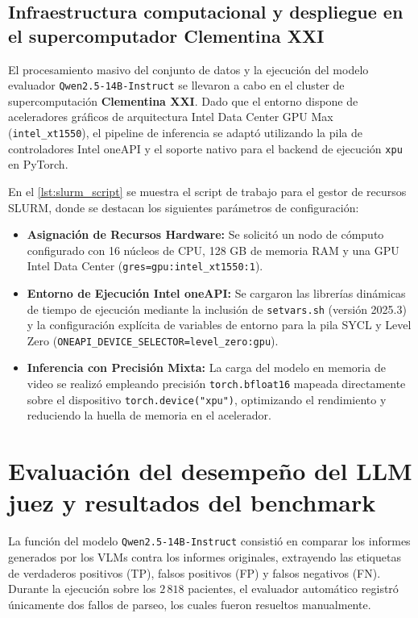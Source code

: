 \documentclass[../tesis.tex]{subfiles}
\begin{document}
\subsection{Infraestructura computacional y despliegue en el supercomputador Clementina XXI}
\label{subsec:clementina_xxi}

El procesamiento masivo del conjunto de datos y la ejecución del modelo evaluador \texttt{Qwen2.5-14B-Instruct} se llevaron a cabo en el cluster de supercomputación \textbf{Clementina XXI}. Dado que el entorno dispone de aceleradores gráficos de arquitectura Intel Data Center GPU Max (\texttt{intel\_xt1550}), el pipeline de inferencia se adaptó utilizando la pila de controladores Intel oneAPI y el soporte nativo para el backend de ejecución \texttt{xpu} en PyTorch.

En el \autoref{lst:slurm_script} se muestra el script de trabajo para el gestor de recursos SLURM, donde se destacan los siguientes parámetros de configuración:

\begin{itemize}
    \item \textbf{Asignación de Recursos Hardware:} Se solicitó un nodo de cómputo configurado con 16 núcleos de CPU, 128 GB de memoria RAM y una GPU Intel Data Center (\texttt{gres=gpu:intel\_xt1550:1}).
    \item \textbf{Entorno de Ejecución Intel oneAPI:} Se cargaron las librerías dinámicas de tiempo de ejecución mediante la inclusión de \texttt{setvars.sh} (versión 2025.3) y la configuración explícita de variables de entorno para la pila SYCL y Level Zero (\texttt{ONEAPI\_DEVICE\_SELECTOR=level\_zero:gpu}).
    \item \textbf{Inferencia con Precisión Mixta:} La carga del modelo en memoria de video se realizó empleando precisión \texttt{torch.bfloat16} mapeada directamente sobre el dispositivo \texttt{torch.device("xpu")}, optimizando el rendimiento y reduciendo la huella de memoria en el acelerador.
\end{itemize}



\section{Evaluación del desempeño del LLM juez y resultados del benchmark}
\label{sec:eval_juez_benchmark}

La función del modelo \texttt{Qwen2.5-14B-Instruct} consistió en comparar los informes generados por los VLMs contra los informes originales, extrayendo las etiquetas de verdaderos positivos (TP), falsos positivos (FP) y falsos negativos (FN). Durante la ejecución sobre los $2\,818$ pacientes, el evaluador automático registró únicamente dos fallos de parseo, los cuales fueron resueltos manualmente.
\end{document}
